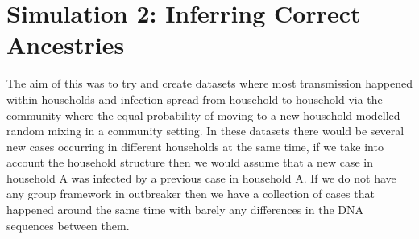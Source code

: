\documentclass[11pt,a4paper]{report}
\begin{document}
\section{Simulation 2: Inferring Correct Ancestries}
The aim of this was to try and create datasets where most transmission happened within households and infection spread from household to household via the community where the equal probability of moving to a new household modelled random mixing in a community setting. In these datasets there would be several new cases occurring in different households at the same time, if we take into account the household structure then we would assume that a new case in household A was infected by a previous case in household A. If we do not have any group framework in outbreaker then we have a collection of cases that happened around the same time with barely any differences in the DNA sequences between them.
\end{document}
